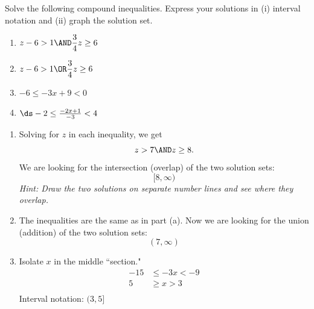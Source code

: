 \documentclass{ximera}
\begin{document}
\begin{problem}
Solve the following compound inequalities. Express your solutions in (i) interval notation
and (ii) graph the solution set.
\begin{enumerate}
  \item[(a)] $z - 6 > 1 \AND \dfrac{3}{4}z \geq 6$
  \medskip
  \item[(b)] $z - 6 > 1 \OR \dfrac{3}{4}z \geq 6$
  \medskip
  \item[(c)] $-6 \leq -3x+9 < 0$
  \medskip
  \item[(d)] $\ds -2 \leq \frac{-2x+1}{-3} < 4$
\end{enumerate}

\begin{solution}
\begin{enumerate}
  \item[(a)] Solving for $z$ in each inequality, we get
  $$z > 7 \AND z \geq 8.$$
  We are looking for the intersection (overlap) of the two solution sets: $$[8,\infty)$$
  \textit{Hint: Draw the two solutions on separate number lines and see where they overlap.}


  \item[(b)] The inequalities are the same as in part (a). Now we are looking for the union
  (addition) of the two solution sets:
  $$(7,\infty)$$


  \item[(c)] Isolate $x$ in the middle ``section."
  \begin{align*}
    -15 &\leq -3x < -9\\
    5 &\geq x > 3\\
  \end{align*}
  Interval notation: $(3,5]$



\end{enumerate}
\end{solution}
\end{problem}
\end{document}
